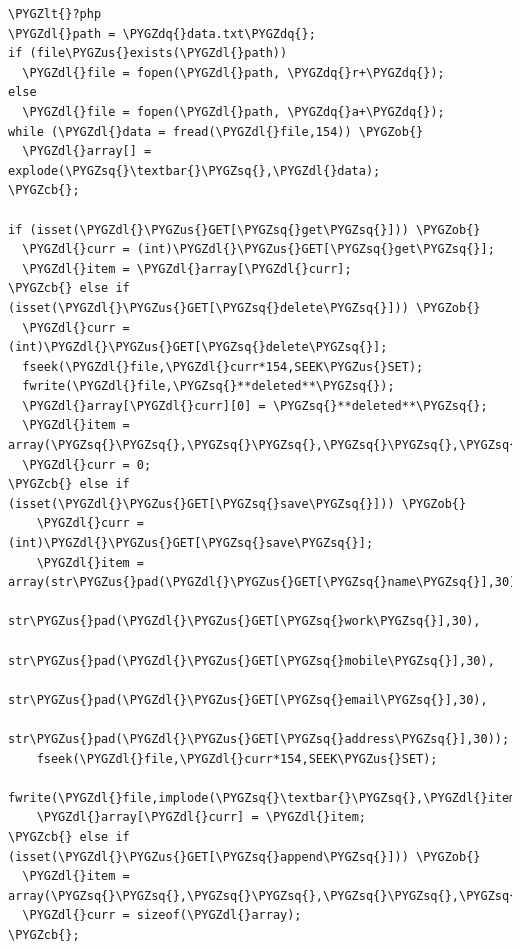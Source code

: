 \documentclass[a5paper,10pt,spanish]{sphinxmanual}
\def\PYGZus{\char`\_}
\def\PYGZob{\char`\{}
\def\PYGZcb{\char`\}}
\def\PYGZlt{\char`\<}
\def\PYGZdl{\char`\$}
\def\PYGZsq{\char`\'}
\def\PYGZdq{\char`\"}
\begin{document}
\begin{Verbatim}[commandchars=\\\{\}]
\PYGZlt{}?php
\PYGZdl{}path = \PYGZdq{}data.txt\PYGZdq{};
if (file\PYGZus{}exists(\PYGZdl{}path))
  \PYGZdl{}file = fopen(\PYGZdl{}path, \PYGZdq{}r+\PYGZdq{});
else
  \PYGZdl{}file = fopen(\PYGZdl{}path, \PYGZdq{}a+\PYGZdq{});
while (\PYGZdl{}data = fread(\PYGZdl{}file,154)) \PYGZob{}
  \PYGZdl{}array[] = explode(\PYGZsq{}\textbar{}\PYGZsq{},\PYGZdl{}data);
\PYGZcb{};

if (isset(\PYGZdl{}\PYGZus{}GET[\PYGZsq{}get\PYGZsq{}])) \PYGZob{}
  \PYGZdl{}curr = (int)\PYGZdl{}\PYGZus{}GET[\PYGZsq{}get\PYGZsq{}];
  \PYGZdl{}item = \PYGZdl{}array[\PYGZdl{}curr];
\PYGZcb{} else if (isset(\PYGZdl{}\PYGZus{}GET[\PYGZsq{}delete\PYGZsq{}])) \PYGZob{}
  \PYGZdl{}curr = (int)\PYGZdl{}\PYGZus{}GET[\PYGZsq{}delete\PYGZsq{}];
  fseek(\PYGZdl{}file,\PYGZdl{}curr*154,SEEK\PYGZus{}SET);
  fwrite(\PYGZdl{}file,\PYGZsq{}**deleted**\PYGZsq{});
  \PYGZdl{}array[\PYGZdl{}curr][0] = \PYGZsq{}**deleted**\PYGZsq{};
  \PYGZdl{}item = array(\PYGZsq{}\PYGZsq{},\PYGZsq{}\PYGZsq{},\PYGZsq{}\PYGZsq{},\PYGZsq{}\PYGZsq{},\PYGZsq{}\PYGZsq{});
  \PYGZdl{}curr = 0;
\PYGZcb{} else if (isset(\PYGZdl{}\PYGZus{}GET[\PYGZsq{}save\PYGZsq{}])) \PYGZob{}
    \PYGZdl{}curr = (int)\PYGZdl{}\PYGZus{}GET[\PYGZsq{}save\PYGZsq{}];
    \PYGZdl{}item = array(str\PYGZus{}pad(\PYGZdl{}\PYGZus{}GET[\PYGZsq{}name\PYGZsq{}],30),
                  str\PYGZus{}pad(\PYGZdl{}\PYGZus{}GET[\PYGZsq{}work\PYGZsq{}],30),
                  str\PYGZus{}pad(\PYGZdl{}\PYGZus{}GET[\PYGZsq{}mobile\PYGZsq{}],30),
                  str\PYGZus{}pad(\PYGZdl{}\PYGZus{}GET[\PYGZsq{}email\PYGZsq{}],30),
                  str\PYGZus{}pad(\PYGZdl{}\PYGZus{}GET[\PYGZsq{}address\PYGZsq{}],30));
    fseek(\PYGZdl{}file,\PYGZdl{}curr*154,SEEK\PYGZus{}SET);
    fwrite(\PYGZdl{}file,implode(\PYGZsq{}\textbar{}\PYGZsq{},\PYGZdl{}item));
    \PYGZdl{}array[\PYGZdl{}curr] = \PYGZdl{}item;
\PYGZcb{} else if (isset(\PYGZdl{}\PYGZus{}GET[\PYGZsq{}append\PYGZsq{}])) \PYGZob{}
  \PYGZdl{}item = array(\PYGZsq{}\PYGZsq{},\PYGZsq{}\PYGZsq{},\PYGZsq{}\PYGZsq{},\PYGZsq{}\PYGZsq{},\PYGZsq{}\PYGZsq{});
  \PYGZdl{}curr = sizeof(\PYGZdl{}array);
\PYGZcb{};


\end{Verbatim}
\end{document}
